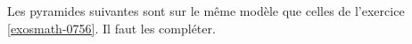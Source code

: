 
\begin{exercice}\label{exosmath-0757}


    Les pyramides suivantes sont sur le même modèle que celles de l'exercice \ref{exosmath-0756}. Il faut les compléter.


    \begin{multicols}{2}

\begin{center}
   
\end{center}


\columnbreak

\begin{center}
   
\end{center}


    \end{multicols}

\end{exercice}
